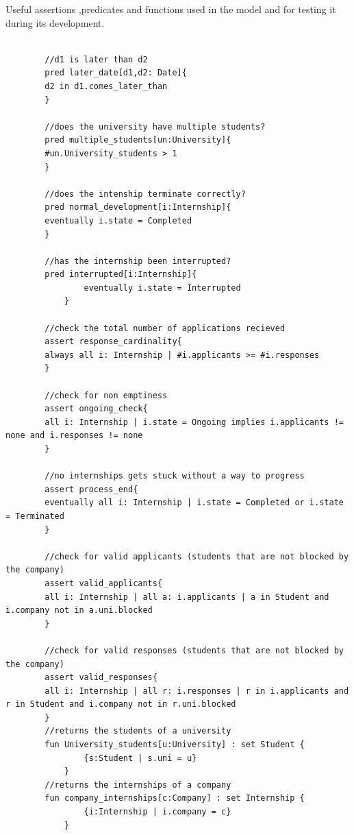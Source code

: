 Useful assertions ,predicates and functions used in the model and for testing it during its development.

\begin{lstlisting}[language=Alloy]
    
        //d1 is later than d2
        pred later_date[d1,d2: Date]{
        d2 in d1.comes_later_than
        }
        
        //does the university have multiple students?
        pred multiple_students[un:University]{
        #un.University_students > 1
        }
        
        //does the intenship terminate correctly?
        pred normal_development[i:Internship]{
        eventually i.state = Completed
        }
        
        //has the internship been interrupted?
        pred interrupted[i:Internship]{
                eventually i.state = Interrupted
            }
        
        //check the total number of applications recieved
        assert response_cardinality{
        always all i: Internship | #i.applicants >= #i.responses
        }
        
        //check for non emptiness
        assert ongoing_check{
        all i: Internship | i.state = Ongoing implies i.applicants != none and i.responses != none
        }
        
        //no internships gets stuck without a way to progress
        assert process_end{
        eventually all i: Internship | i.state = Completed or i.state = Terminated
        }
        
        //check for valid applicants (students that are not blocked by the company)
        assert valid_applicants{
        all i: Internship | all a: i.applicants | a in Student and i.company not in a.uni.blocked
        }
        
        //check for valid responses (students that are not blocked by the company)
        assert valid_responses{
        all i: Internship | all r: i.responses | r in i.applicants and r in Student and i.company not in r.uni.blocked
        }
        //returns the students of a university
        fun University_students[u:University] : set Student {
                {s:Student | s.uni = u}
            }
        //returns the internships of a company
        fun company_internships[c:Company] : set Internship {
                {i:Internship | i.company = c}
            }
        
\end{lstlisting}


